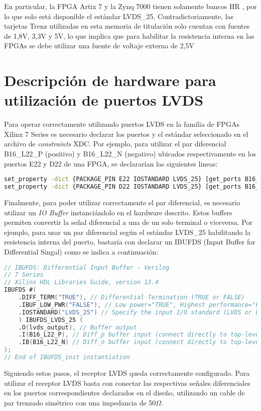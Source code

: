 	En particular, la FPGA Artix 7 y la Zynq 7000 tienen solamente bancos HR \cite{Xilinx2011Artix-7Characteristics}, por lo que solo está disponible el estándar LVDS\_25. Contradictoriamente, las tarjetas Trenz utilizadas en esta memoria de titulación solo cuentan con fuentes de 1,8V, 3,3V y 5V, lo que implica que para habilitar la resistencia interna en las FPGAs se debe utilizar una fuente de voltaje externa de 2,5V

\section{Descripción de hardware para utilización de puertos LVDS}

	Para operar correctamente utilizando puertos LVDS en la familia de FPGAs Xilinx 7 Series es necesario declarar los puertos y el estándar seleccionado en el archivo de \textit{constraints} XDC. Por ejemplo, para utilizar el par diferencial B16\_L22\_P (positivo) y B16\_L22\_N (negativo) ubicados respectivamente en los puertos E22 y D22 de una FPGA, se declararían las siguientes lineas:

\begin{lstlisting}[language=bash, frame=single, basicstyle=\tiny]
set_property -dict {PACKAGE_PIN E22 IOSTANDARD LVDS_25} [get_ports B16_L22_P];
set_property -dict {PACKAGE_PIN D22 IOSTANDARD LVDS_25} [get_ports B16_L22_N];
\end{lstlisting}


	Finalmente, para poder utilizar correctamente el par diferencial, es necesario utilizar un \textit{IO Buffer} instanciándolo en el hardware descrito. Estos buffers permiten convertir la señal diferencial a una de un solo terminal o viceversa. Por ejemplo, para usar un par diferencial según el estándar LVDS\_25 habilitando la resistencia interna del puerto, bastaría con declarar un IBUFDS (Input Buffer for Differential Singal)\cite{Xilinx2012XilinxDesigns} como se indica a continuación:
	

\begin{lstlisting}[language=Verilog, frame=single, basicstyle=\tiny]
// IBUFDS: Differential Input Buffer - Verilog
// 7 Series
// Xilinx HDL Libraries Guide, version 13.4
IBUFDS #(
    .DIFF_TERM("TRUE"), // Differential Termination (TRUE or FALSE)
    .IBUF_LOW_PWR("FALSE"), // Low power="TRUE", Highest performance="FALSE"
    .IOSTANDARD("LVDS_25") // Specify the input I/O standard (LVDS or LVDS_25)
    ) IBUFDS_LVDS_25 (
    .O(lvds_output), // Buffer output
    .I(B16_L22_P), // Diff_p buffer input (connect directly to top-level port)
    .IB(B16_L22_N) // Diff_n buffer input (connect directly to top-level port)
);
// End of IBUFDS_inst instantiation
\end{lstlisting}

Siguiendo estos pasos, el receptor LVDS queda correctamente configurado. Para utilizar el receptor LVDS basta con conectar las respectivas señales diferenciales en los puertos correspondientes declarados en el diseño, utilizando un cable de par trenzado simétrico con una impedancia de 50$\Omega$.